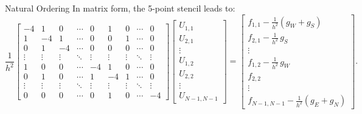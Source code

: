 \begin{definition}{Natural Ordering}{}
  In matrix form, the 5-point stencil leads to:
  \[
    \frac{1}{h^2}
    \begin{bmatrix}
      -4     & 1      & 0      & \cdots & 0      & 1      & 0      & \cdots & 0      \\
      1      & -4     & 1      & \cdots & 0      & 0      & 1      & \cdots & 0      \\
      0      & 1      & -4     & \cdots & 0      & 0      & 0      & \cdots & 0      \\
      \vdots & \vdots & \vdots & \ddots & \vdots & \vdots & \vdots & \ddots & \vdots \\
      1      & 0      & 0      & \cdots & -4     & 1      & 0      & \cdots & 0      \\
      0      & 1      & 0      & \cdots & 1      & -4     & 1      & \cdots & 0      \\
      \vdots & \vdots & \vdots & \ddots & \vdots & \vdots & \vdots & \ddots & \vdots \\
      0      & 0      & 0      & \cdots & 0      & 1      & 0      & \cdots & -4
    \end{bmatrix}
    \begin{bmatrix}
      U_{1,1} \\
      U_{2,1} \\
      \vdots  \\
      U_{1,2} \\
      U_{2,2} \\
      \vdots  \\
      U_{N-1,N-1}
    \end{bmatrix}
    =
    \begin{bmatrix}
      f_{1,1} - \frac{1}{h^2}(g_W + g_S) \\
      f_{2,1} - \frac{1}{h^2}\,g_S       \\
      \vdots                             \\
      f_{1,2} - \frac{1}{h^2}\,g_W       \\
      f_{2,2}                            \\
      \vdots                             \\
      f_{N-1,N-1} - \frac{1}{h^2}(g_E + g_N)
    \end{bmatrix}.
  \]

\end{definition}

